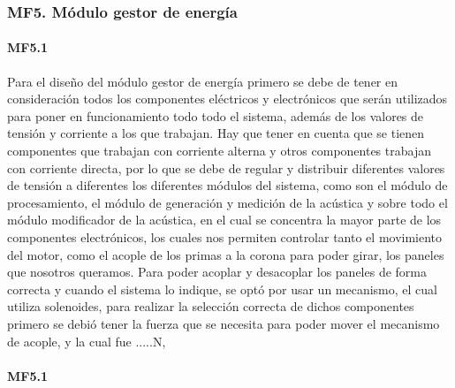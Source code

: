 \subsubsection{MF5. Módulo gestor de energía}

\paragraph{MF5.1}
Para el diseño del módulo gestor de energía primero se debe de tener en consideración todos los componentes eléctricos y electrónicos que serán utilizados para poner en funcionamiento todo todo el sistema, además de los valores de tensión y corriente a los que trabajan. Hay que tener en cuenta que se tienen componentes que trabajan con corriente alterna y otros componentes trabajan con corriente directa, por lo que se debe de regular y distribuir diferentes valores de tensión a diferentes los diferentes módulos del sistema, como son el módulo de procesamiento, el módulo de generación y medición de la acústica y sobre todo el módulo modificador de la acústica, en el cual se concentra la mayor parte de los componentes electrónicos, los cuales nos permiten controlar tanto el movimiento del motor, como el acople de los primas a la corona para poder girar, los paneles que nosotros queramos.
Para poder acoplar y desacoplar los paneles de forma correcta y cuando el sistema lo indique, se optó por usar un mecanismo, el cual utiliza solenoides, para realizar la selección correcta de dichos componentes primero se debió tener la fuerza que se necesita para poder mover el mecanismo de acople, y la cual fue .....N,
\paragraph{MF5.1}